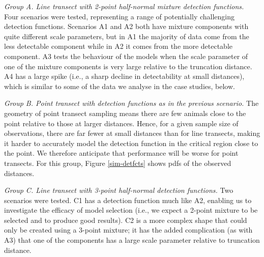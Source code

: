 \documentclass[10pt]{article}
\begin{document}
\textit{Group A. Line transect with 2-point half-normal mixture detection functions.} Four scenarios were tested, representing a range of potentially challenging detection functions.  Scenarios A1 and A2 both have mixture components with quite different scale parameters, but in A1 the majority of data come from the less detectable component while in A2 it comes from the more detectable component.  A3 tests the behaviour of the models when the scale parameter of one of the mixture components is very large relative to the truncation distance. A4 has a large spike (i.e., a sharp decline in detectability at small distances), which is similar to some of the data we analyse in the case studies, below.

\textit{Group B. Point transect with detection functions as in the previous scenario.} The geometry of point transect sampling means there are few animals close to the point relative to those at larger distances. Hence, for a given sample size of observations, there are far fewer at small distances than for line transects, making it harder to accurately model the detection function in the critical region close to the point.  We therefore anticipate that performance will be worse for point transects. For this group, Figure \ref{sim-detfcts} shows pdfs of the observed distances.

\textit{Group C. Line transect with 3-point half-normal detection functions.} Two scenarios were tested. C1 has a detection function much like A2, enabling us to investigate the efficacy of model selection (i.e., we expect a 2-point mixture to be selected and to produce good results). C2 is a more complex shape that could only be created using a 3-point mixture; it has the added complication (as with A3) that one of the components has a large scale parameter relative to truncation distance.
\end{document}
